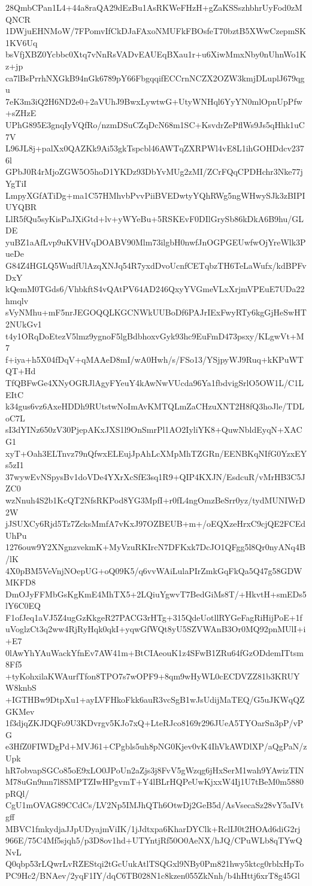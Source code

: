 28QmbCPan1L4+44a8raQA29dEzBu1AsRKWeFHzH+gZaKSSszhbhrUyFod0zMQNCR
1DWjuEHNMoW/7FPomvIfCkDJaFAxoNMUFkFBOsfeT70bztB5XWwCzepmSK1KV6Uq
bsVfjXBZ0Ycbbc0Xtq7vNnRsVADvEAUEqBXau1r+u6XiwMmxNby0nUhnWo1Kz+jp
ca7lBsPrrhNXGkB94nGk6789pY66FbgqqifECCrnNCZX2OZW3kmjDLuplJ679qgu
7eK3m3iQ2H6ND2e0+2aVUhJ9BwxLywtwG+UtyWNHql6YyYN0mlOpnUpPfw+sZHzE
UPhG895E3gnqIyVQfRo/nzmDSuCZqDcN68m1SC+KsvdrZePflWs9Js5qHhk1uC7V
L96JL8j+palXx0QAZKk9Ai53gkTspcbl46AWTqZXRPWl4vE8L1ihGOHDdcv2376l
GPbJ0R4rMjoZGW5O5hoD1YKDz93DbYvMUg2zMI/ZCrFQqCPDHchr3Nke77jYgTiI
LmpyXGfATiDg+ma1C57HMhvbPvvPiiBVEDwtyYQhRWg5ngWHwySJk3zBIPIUYQBR
LlR5fQu5syKisPaJXiGtd+lv+yWYeBu+5RSKEvF0DIlGrySb86kDkA6B9hu/GLDE
yuBZ1aAfLvp9uKVHVqDOABV90Mlm73ilgbH0nwfJnOGPGEUwfwOjYreWlk3PueDe
G84Z4HGLQ5WudfUlAzqXNJq54R7yxdDvoUcnfCETqbzTH6TeLaWufx/kdBPFvDxY
kQemM0TGds6/VhbkftS4vQAtPV64AD246QxyYVGmeVLxXrjmVPEuE7UDa22hmqlv
sVyNMhu+mF5nrJEGOQQLKGCNWkUUBoDf6PAJrIExFwyRTy6kgGjHeSwHT2NUkGv1
t4y1ORqDoEtezV5lmz9ygnoF5lgBdbhoxvGyk93hc9EuFmD473psxy/KLgwVt+M7
f+iya+h5X04fDqV+qMAAeD8mI/wA0Hwh/s/FSo13/YSjpyWJ9Ruq+kKPuWTQT+Hd
TfQBFwGe4XNyOGRJlAgyFYeuY4kAwNwVUcda96Ya1fbdvigSrlO5OW1L/C1LEItC
k34gus6vz6AxeHDDh9RUtstwNoImAvKMTQLmZaCHzuXNT2H8fQ3hoJle/TDLoC7L
sI3dYINz650zV30PjepAKxJXS1l9OnSmrPl1AO2IyliYK8+QuwNbldEyqN+XACG1
xyT+Oah3ELTnvz79nQfwxELEujJpAhLcXMpMhTZGRn/EENBKqNIfG0YzxEYs5zI1
37wywEvNSpysBv1doVDe4YXrXcSfE3sq1R9+QIP4KXJN/EsdcuR/vMrHB3C5JZC0
wzNnuh4S2b1KcQT2NfsRKPod8YG3MpfI+r0fL4ngOmzBeSrr0yz/tydMUNIWrD2W
jJSUXCy6Rjd5Tz7ZcksMmfA7vKxJ97OZBEUB+m+/oEQXzeHrxC9cjQE2FCEdUhPu
1276ouw9Y2XNgnzvekmK+MyVzuRKIrcN7DFKxk7DcJO1QFgg5l8Qr0nyANq4B/lK
4X0pBM5VeVnjNOepUG+oQ09K5/q6vvWAiLulaPIrZmkGqFkQa5Q47g58GDWMKFD8
DmOJyFFMbGsKgKmE4MhTX5+2LQiuYgwvT7BedGiMs8T/+HkvtH+smEDs5lY6C0EQ
F1ofJeq1aVJ5Z4ugGzKkgeR27PACG3rHTg+315QdeUotllRYGeFagRiHijPoE+1f
uVoglzCt3q2ww4RjRyHqk0qkI+yqwGfWQt8yU5SZVWAnB3Or0MQ92pnMUlI+i+E7
0lAwYhYAuWackYfnEv7AW41m+BtCIAeouK1z4SFwB1ZRu64fGzODdemITtsm8Ff5
+tyKohxilaKWAurfTfon8TPO7s7wOPF9+8qm9wHyWL0cECDVZZ81b3KRUYW8knbS
+IGTHBw9DtpXu1+ayLVFHkoFkk6auR3vcSgB1wJsUdijMaTEQ/G5uJKWqQZGKMev
1f3djqZKJDQFo9U3KDvrgv5KJo7xQ+LteRJco8169r296JUeA5TYOarSn3pP/vPG
e3HfZ0FIWDgPd+MVJ61+CPgbls5uh8pNG0Kjev0vK4IhVkAWDlXP/aQgPaN/zUpk
hR7obvapSGCo85oE9xLO0JPoUn2aZjs3j8FvV5gWzqg6jHxSerM1wah9YAwizTIN
M78uGn9mn7l8SMPTZIwHPgvmT+Y4lBLrHQPeUwKjxxW4Ij1U7tBeM0m5880pRQl/
CgU1mOVAG89CCdCs/LV2Np5IMJhQTh6OtwDj2GeB5d/AsVsecaSz28vY5aIVtgff
MBVC1fmkydjaJJpUDyajmViIK/1jJdtxpa6KharDYClk+RclIJ0t2HOAd6diG2rj
966E/75C4Mf5sjqh5/p3D8ov1hd+UTYntjRf50O0AeNX/hJQ/CPuWLb8qTYwQNvL
Q0qbp53rLQwrLvRZEStqi2tGcUukAtlTSQGxl9NBy0Pm821hwy5ktcg0rblxHpTo
PC9Hc2/BNAev/2yqF1IY/dqC6TB028N1c8kzen055ZkNnh/b4hHttj6xrT8g45Gl
